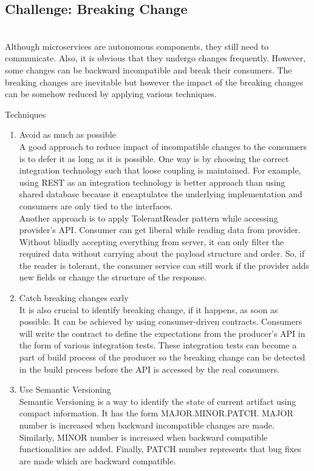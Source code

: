 \subsection{Challenge: Breaking Change}\label{section:challanges_of_microservices_architecture/integration/breaking_change}
\\
Although microservices are autonomous components, they still need to communicate. Also, it is obvious that they undergo changes frequently. However, some changes can be backward incompatible and break their consumers. The breaking changes are inevitable but however the impact of the breaking changes can be somehow reduced by applying various techniques. \cite{Newman:2015aa}
\begin{shaded}Techniques\end{shaded}
\begin{enumerate}
\item Avoid as much as possible \\ A good approach to reduce impact of incompatible changes to the consumers is to defer it as long as it is possible. One way is by choosing the correct integration technology such that loose coupling is maintained. For example, using \acrshort{REST} as an integration technology is better approach than using shared database because it encaptulates the underlying implementation and consumers are only tied to the interfaces.\\
Another approach is to apply TolerantReader pattern while accessing provider's \acrshort{API}. \cite{Fowler:2011aa} Consumer can get liberal while reading data from provider. Without blindly accepting everything from server, it can only filter the required data without carrying about the payload structure and order. So, if the reader is tolerant, the consumer service can still work if the provider adds new fields or change the structure of the response.
\item Catch breaking changes early \\ It is also crucial to identify breaking change, if it happens, as soon as  possible. It can be achieved by using consumer-driven contracts. Consumers will write the contract to define the expectations from the producer's \acrshort{API} in the form of various integration tests. These integration tests can become a part of build process of the producer so the breaking change can be detected in the build process before the \acrshort{API} is accessed by the real consumers.
\item Use Semantic Versioning \\ Semantic Versioning is a way to identify the state of current artifact using compact information. It has the form MAJOR.MINOR.PATCH. MAJOR number is increased when backward incompatible changes are made. Similarly, MINOR number is increased when backward compatible functionalities are added. Finally, PATCH number represents that bug fixes are made which are backward compatible.\\

\end{enumerate}
